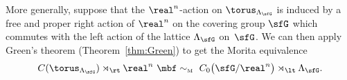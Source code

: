 More generally, suppose that the $\real^n$-action on $\torus_{\Lambda_\sfG}$ is
induced by a free and proper right action of $\real^n$ on the covering group $\sfG$
which commutes with the left action of the lattice $\Lambda_\sfG$ on~$\sfG$. We can then apply Green's theorem
(Theorem~\ref{thm:Green}) to get the Morita
equivalence
\begin{gather}\label{scheme}
C(\torus_{\Lambda_\sfG})\rtimes_\rt \real^n \ \mbf\sim_{\text{\tiny M}} \
C_0\big(\sfG/\real^n\big)\rtimes_\lt \Lambda_\sfG .
\end{gather}
